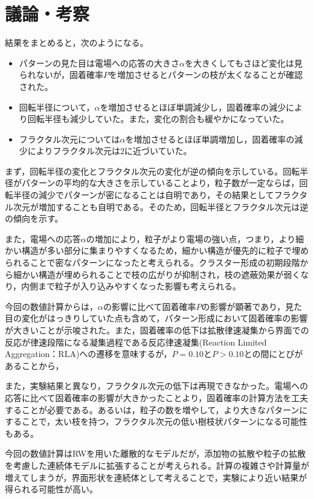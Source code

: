 \documentclass[autodetect-engine,dvi=dvipdfmx,a4paper,ja=standard,oneside,openany,11pt,draft]{bxjsbook}
\begin{document}
\section{議論・考察}
結果をまとめると，次のようになる。
\begin{itemize}
  \item パターンの見た目は電場への応答の大きさ$\alpha$を大きくしてもさほど変化は見られないが，固着確率$P$を増加させるとパターンの枝が太くなることが確認された。
  \item 回転半径について，$\alpha$を増加させるとほぼ単調減少し，固着確率の減少により回転半径も減少していた。また，変化の割合も緩やかになっていた。
  \item フラクタル次元については$\alpha$を増加させるとほぼ単調増加し，固着確率の減少によりフラクタル次元は2に近づいていた。
\end{itemize}

まず，回転半径の変化とフラクタル次元の変化が逆の傾向を示している。回転半径がパターンの平均的な大きさを示していることより，粒子数が一定ならば，回転半径の減少でパターンが密になることは自明であり，その結果としてフラクタル次元が増加することも自明である。そのため，回転半径とフラクタル次元は逆の傾向を示す。

また，電場への応答$\alpha$の増加により，粒子がより電場の強い点，つまり，より細かい構造が多い部分に集まりやすくなるため，細かい構造が優先的に粒子で埋められることで密なパターンになったと考えられる。クラスター形成の初期段階から細かい構造が埋められることで枝の広がりが抑制され，枝の遮蔽効果が弱くなり，内側まで粒子が入り込みやすくなった影響も考えられる。

今回の数値計算からは，$\alpha$の影響に比べて固着確率$P$の影響が顕著であり，見た目の変化がはっきりしていた点も含めて，パターン形成において固着確率の影響が大きいことが示唆された。また，固着確率の低下は拡散律速凝集から界面での反応が律速段階になる凝集過程である反応律速凝集(Reaction Limited Aggregation：RLA)への遷移を意味するが，$P=0.10$と$P>0.10$との間にとびがあることから，

また，実験結果と異なり，フラクタル次元の低下は再現できなかった。電場への応答に比べて固着確率の影響が大きかったことより，固着確率の計算方法を工夫することが必要である。あるいは，粒子の数を増やして，より大きなパターンにすることで，太い枝を持つ，フラクタル次元の低い樹枝状パターンになる可能性もある。

今回の数値計算はRWを用いた離散的なモデルだが，添加物の拡散や粒子の拡散を考慮した連続体モデルに拡張することが考えられる。計算の複雑さや計算量が増えてしまうが，界面形状を連続体として考えることで，実験により近い結果が得られる可能性が高い。

\ifdraft{
  
  
}{}
\end{document}
